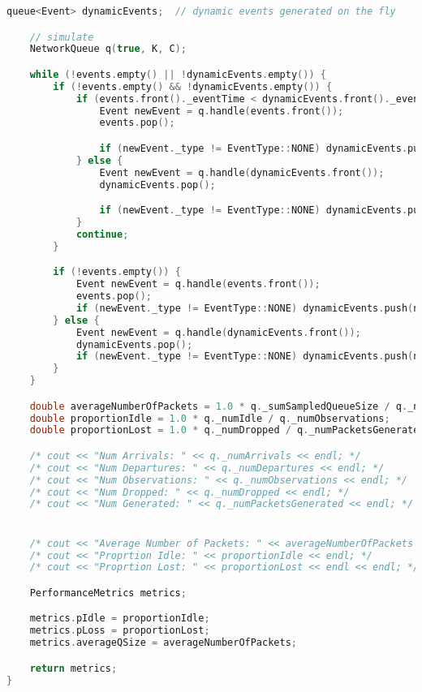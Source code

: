 \documentclass{article}
\begin{document}
\begin{lstlisting}[language=C++,
                   directivestyle={\color{black}}
                   emph={int,char,double,float,unsigned},
                   emphstyle={\color{blue}}
                  ]
    queue<Event> dynamicEvents;  // dynamic events generated on the fly

    // simulate
    NetworkQueue q(true, K, C);

    while (!events.empty() || !dynamicEvents.empty()) {
        if (!events.empty() && !dynamicEvents.empty()) {
            if (events.front()._eventTime < dynamicEvents.front()._eventTime) {
                Event newEvent = q.handle(events.front());
                events.pop();

                if (newEvent._type != EventType::NONE) dynamicEvents.push(newEvent);
            } else {
                Event newEvent = q.handle(dynamicEvents.front());
                dynamicEvents.pop();

                if (newEvent._type != EventType::NONE) dynamicEvents.push(newEvent);
            }
            continue;
        }

        if (!events.empty()) {
            Event newEvent = q.handle(events.front());
            events.pop();
            if (newEvent._type != EventType::NONE) dynamicEvents.push(newEvent);
        } else {
            Event newEvent = q.handle(dynamicEvents.front());
            dynamicEvents.pop();
            if (newEvent._type != EventType::NONE) dynamicEvents.push(newEvent);
        }
    }

    double averageNumberOfPackets = 1.0 * q._sumSampledQueueSize / q._numObservations;
    double proportionIdle = 1.0 * q._numIdle / q._numObservations;
    double proportionLost = 1.0 * q._numDropped / q._numPacketsGenerated;

    /* cout << "Num Arrivals: " << q._numArrivals << endl; */
    /* cout << "Num Departures: " << q._numDepartures << endl; */
    /* cout << "Num Observations: " << q._numObservations << endl; */
    /* cout << "Num Dropped: " << q._numDropped << endl; */
    /* cout << "Num Generated: " << q._numPacketsGenerated << endl; */


    /* cout << "Average Number of Packets: " << averageNumberOfPackets << endl; */
    /* cout << "Proprtion Idle: " << proportionIdle << endl; */
    /* cout << "Proprtion Lost: " << proportionLost << endl << endl; */

    PerformanceMetrics metrics;

    metrics.pIdle = proportionIdle;
    metrics.pLoss = proportionLost;
    metrics.averageQSize = averageNumberOfPackets;

    return metrics;
}
\end{lstlisting}
\end{document}
